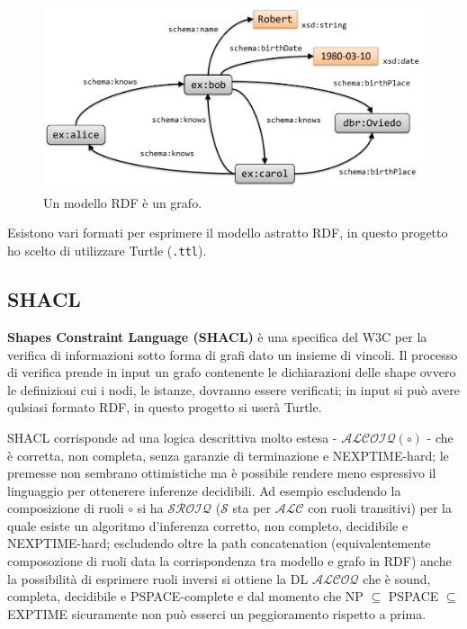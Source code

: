 \documentclass{article}
\begin{document}
\begin{figure}[h!t]
    \caption{Un modello RDF è un grafo.}
    \label{fig:graph}
    \includegraphics[scale=0.3]{images/RDFGraph.png}
    \centering
\end{figure}

Esistono vari formati per esprimere il modello astratto RDF, in questo progetto ho scelto di utilizzare Turtle (\texttt{.ttl}).

\subsection{SHACL}
\textbf{Shapes Constraint Language (SHACL)} è una specifica del W3C per la verifica di informazioni sotto forma di grafi dato un insieme di vincoli. Il processo di verifica prende in input un grafo contenente le dichiarazioni delle shape ovvero le definizioni cui i nodi, le istanze, dovranno essere verificati; in input si può avere qulsiasi formato RDF, in questo progetto si userà Turtle. 

SHACL corrisponde ad una logica descrittiva molto estesa - $\mathcal{ALCOIQ(\circ)}$ - che è corretta, non completa, senza garanzie di terminazione e NEXPTIME-hard; le premesse non sembrano ottimistiche ma è possibile rendere meno espressivo il linguaggio per ottenerere inferenze decidibili. Ad esempio escludendo la composizione di ruoli $\circ$ si ha $\mathcal{SROIQ}$ ($\mathcal{S}$ sta per $\mathcal{ALC}$ con ruoli transitivi) per la quale esiste un algoritmo d'inferenza corretto, non completo, decidibile e NEXPTIME-hard; escludendo oltre la path concatenation (equivalentemente composozione di ruoli data la corrispondenza tra modello e grafo in RDF) anche la possibilità di esprimere ruoli inversi si ottiene la DL $\mathcal{ALCOQ}$ che è sound, completa, decidibile e PSPACE-complete e dal momento che NP $\subseteq$ PSPACE $\subseteq$ EXPTIME sicuramente non può esserci un peggioramento rispetto a prima. 
\end{document}
